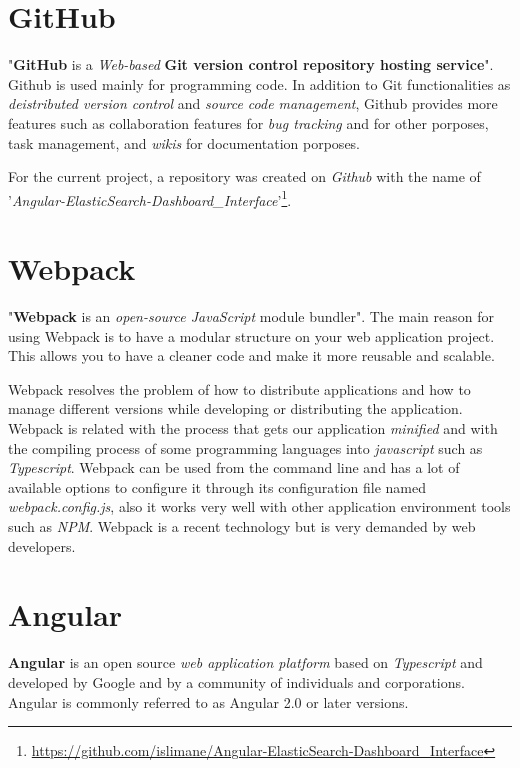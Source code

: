 \documentclass[a4paper, 12pt, english]{book}
\begin{document}
\section{GitHub}
\label{sec:github}

"\textbf{GitHub} is a \textit{Web-based} \textbf{Git version control repository hosting service}". Github is used mainly for programming code. In addition to Git functionalities as \textit{deistributed version control} and \textit{source code management}, Github provides more features such as collaboration features for \textit{bug tracking} and for other porposes, task management, and \textit{wikis} for documentation porposes.

For the current project, a repository was created on \textit{Github} with the name of '\textit{Angular-ElasticSearch-Dashboard\_Interface}'\footnote{\url{https://github.com/islimane/Angular-ElasticSearch-Dashboard\_Interface}}.


\section{Webpack}
\label{sec:webpack}

"\textbf{Webpack} is an \textit{open-source JavaScript} module bundler". The main reason for using Webpack is to have a modular structure on your web application project. This allows you to have a cleaner code and make it more reusable and scalable.

Webpack resolves the problem of how to distribute applications and how to manage different versions while developing or distributing the application. Webpack is related with the process that gets our application \textit{minified} and with the compiling process of some programming languages into \textit{javascript} such as \textit{Typescript}. Webpack can be used from the command line and has a lot of available options to configure it through its configuration file named \textit{webpack.config.js}, also it works very well with other application environment tools such as \textit{NPM}. Webpack is a recent technology but is very demanded by web developers.

\section{Angular}
\label{sec:angular}

\textbf{Angular} is an open source \textit{web application platform} based on \textit{Typescript} and developed by Google and by a community of individuals and corporations.
Angular is commonly referred to as Angular 2.0 or later versions.
\end{document}
